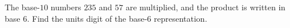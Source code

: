 The base-$10$ numbers $235$ and $57$ are multiplied, and the product is written in base $6$. Find the units digit of the base-$6$ representation.
